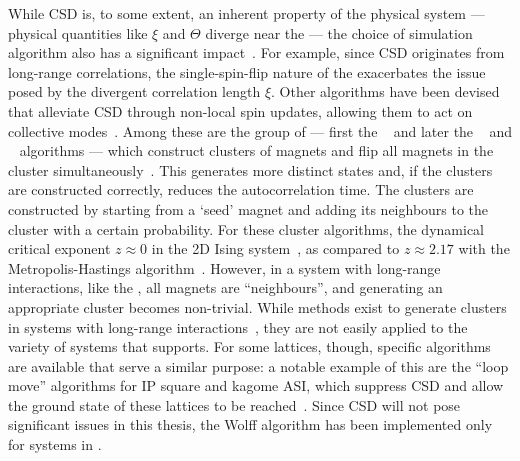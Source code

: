 While CSD is, to some extent, an inherent property of the physical system --- physical quantities like $\xi$ and $\Theta$ diverge near the  --- the choice of simulation algorithm also has a significant impact~\cite{PhD_Reynal}.
For example, since CSD originates from long-range correlations, the single-spin-flip nature of the  exacerbates the issue posed by the divergent correlation length $\xi$.
Other algorithms have been devised that alleviate CSD through non-local spin updates, allowing them to act on collective modes~\cite{BeatCriticalSlowingDown1990}.
Among these are the group of  --- first the ~\cite{SwendsenWang} and later the ~\cite{niedermayer1988general} and ~\cite{Wolff} algorithms --- which construct clusters of magnets and flip all magnets in the cluster simultaneously~\cite{CompStatPhys}. %
This generates more distinct states and, if the clusters are constructed correctly, reduces the autocorrelation time.
The clusters are constructed by starting from a `seed' magnet and adding its neighbours to the cluster with a certain probability.
For these cluster algorithms, the dynamical critical exponent $z \approx 0$ in the 2D  Ising system~\cite{NumericalDynamicalNiedermayer}, as compared to $z\approx2.17$ with the Metropolis-Hastings algorithm~\cite{DynamicExponentMetropolis}.
However, in a system with long-range interactions, like the , all magnets are ``neighbours'', and generating an appropriate cluster becomes non-trivial.
While methods exist to generate clusters in systems with long-range interactions~\cite{MC_spinLongRange}, they are not easily applied to the variety of systems that \hotspice supports.
For some lattices, though, specific algorithms are available that serve a similar purpose: a notable example of this are the ``loop move'' algorithms for IP square and kagome ASI, which suppress CSD and allow the ground state of these lattices to be reached~\cite{LoopMoves,ChargeOrderingKagome}.
Since CSD will not pose significant issues in this thesis, the Wolff algorithm has been implemented only for  systems in \hotspice.

